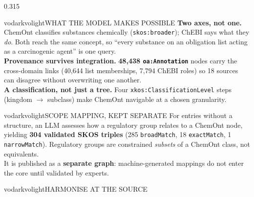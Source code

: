 \documentclass[final]{beamer}
\newlength{\colh}
\begin{document}
\begin{frame}[t]
\begin{columns}[t,onlytextwidth]
            \begin{column}{0.315\textwidth}
                \begin{minipage}[t][\colh][s]{\linewidth}
                    \rule{0pt}{0pt}%
                    \begin{pbox}{vodark}{volight}{WHAT THE MODEL MAKES POSSIBLE}
                        \justifying
                        \textbf{Two axes, not one.} ChemOnt classifies substances chemically
                        (\texttt{skos:broader}); ChEBI says what they \emph{do}. Both reach the same
                        concept, so ``every substance on an obligation list acting as a carcinogenic
                        agent'' is one query.\\[4mm]
                        \textbf{Provenance survives integration.} \textbf{48,438
                        \texttt{oa:Annotation}} nodes carry the cross-domain links (40,644 list
                        memberships, 7,794 ChEBI roles) so 18 sources can disagree without
                        overwriting one another.\\[4mm]
                        \textbf{A classification, not just a tree.} Four
                        \texttt{xkos:ClassificationLevel} steps (kingdom $\rightarrow$ subclass) make
                        ChemOnt navigable at a chosen granularity.
                    \end{pbox}
                    \vfill
                    \begin{pbox}{vodark}{volight}{SCOPE MAPPING, KEPT SEPARATE}
                        \justifying
                        For entries without a structure, an LLM assesses how a regulatory group
                        relates to a ChemOnt node, yielding \textbf{304 validated SKOS triples}
                        (285 \texttt{broadMatch}, 18 \texttt{exactMatch}, 1 \texttt{narrowMatch}).
                        Regulatory groups are constrained \emph{subsets} of a ChemOnt class, not
                        equivalents.\\[5mm]
                        It is published as a \textbf{separate graph}: machine-generated mappings do
                        not enter the core until validated by experts.
                    \end{pbox}
                    \vfill
                    \begin{pbox}{vodark}{volight}{HARMONISE AT THE SOURCE}

\end{pbox}
\end{minipage}
\end{column}
\end{columns}
\end{frame}
\end{document}
